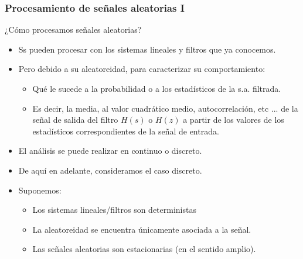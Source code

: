 \documentclass{beamer}
\numberwithin{section}{part}
\begin{document}
  
  
\begin{frame}
  \frametitle{Procesamiento de señales aleatorias I}
  \vspace{-0.2cm}
  \footnotesize
  \alert{¿Cómo procesamos señales aleatorias?}
  \begin{itemize}
    \item Ss pueden procesar con los sistemas lineales y filtros que ya conocemos.
    \item Pero debido a su aleatoreidad, para caracterizar su comportamiento: 
    \begin{itemize}\footnotesize
      \item Qué le sucede a la probabilidad o a los estadísticos de la s.a. filtrada. 
      \item Es decir, la media, al valor cuadrático medio, autocorrelación, etc ... de la señal de salida del filtro $H(s)$ o $H(z)$ a partir de los valores de los estadísticos correspondientes de la señal de entrada.
    \end{itemize}
    \item El análisis se puede realizar en continuo o discreto.
    \item De aquí en adelante, consideramos el caso discreto.
    \item Suponemos:
    \begin{itemize}\footnotesize
      \item Los sistemas lineales/filtros son deterministas
      \item La aleatoreidad se encuentra únicamente asociada a la señal. 
      \item Las señales aleatorias son estacionarias (en el sentido amplio).
    \end{itemize}  
  \end{itemize}
\end{frame}
  
  
\end{document}
